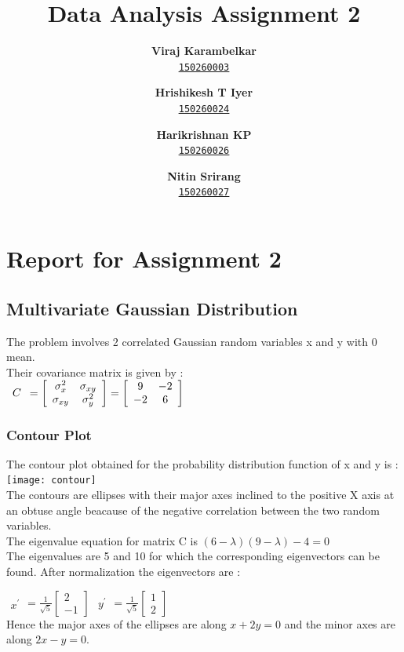\documentclass{extarticle}
\author{
	\textbf{Viraj Karambelkar} \\
	\texttt{\href{mailto:150260003@iitb.ac.in}{\underline{150260003}}}
	\and
	\textbf{Hrishikesh T Iyer} \\
	\texttt{\href{mailto:150260024@iitb.ac.in}{\underline{150260024}}}
	\and
	\textbf{Harikrishnan KP} \\
	\texttt{\href{mailto:150260026@iitb.ac.in}{\underline{150260026}}}
	\and
	\textbf{Nitin Srirang} \\
	\texttt{\href{mailto:150260027@iitb.ac.in}{\underline{150260027}}}
	}
\title{\color{red}\huge{Data Analysis Assignment 2}}
\begin{document}
	\maketitle
	\newpage
	\tableofcontents
	\newpage
	\section{\color{Blue} Report for Assignment 2}
	\subsection{\color{MidnightBlue} Multivariate Gaussian Distribution}
		The problem involves 2 correlated Gaussian random variables x and y with 0 mean.
		\\ Their covariance matrix is given by : \\
		$ \begin{array}{c} C \end{array} = \left [\begin{array}{c c}\sigma _{x}^{2} & \sigma _{xy} \\\sigma _{xy} & \sigma _{y}^			{2}\end{array} \right ] = \left [\begin{array}{c c} 9 & -2 \\-2 & 6\end{array} \right ] $
		\subsubsection{\color{RoyalBlue} Contour Plot}
			The contour plot obtained for the probability distribution function of x and y is : \\
			\texttt{[image: contour]} \\
			The contours are ellipses with their major axes inclined to the positive X axis at an obtuse angle beacause of the 				negative correlation between the two random variables. \\
			The eigenvalue equation for matrix C is $ (6-\lambda)(9-\lambda)-4=0 $ \\
			The eigenvalues are 5 and 10 for which the corresponding eigenvectors can be found. After normalization the
			eigenvectors are :

			$ \begin{array}{c} x^{'} \end{array} = \frac{1}{\sqrt{5}} \left [\begin{array}{c} 2\\-1 \end{array} \right ] $
			$ \begin{array}{c} y^{'} \end{array} = \frac{1}{\sqrt{5}} \left [\begin{array}{c} 1\\2 \end{array} \right ] $ \\
			Hence the major axes of the ellipses are along $ x+2y=0 $ and the minor axes are along $ 2x-y=0 . $
\end{document}
